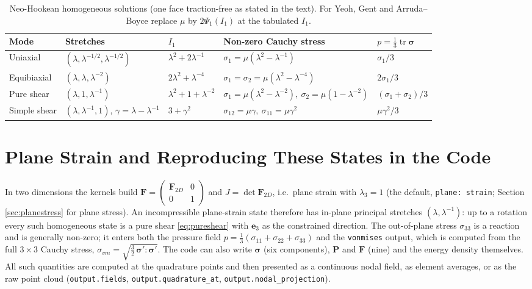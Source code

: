 \documentclass[11pt]{article}
\newcommand{\tr}{\operatorname{tr}}
\newcommand{\be}{\bm{e}}
\newcommand{\bsig}{\bm{\sigma}}
\newcommand{\bP}{\bm{P}}
\newcommand{\bF}{\bm{F}}
\newcommand{\Ione}{I_1}
\newcommand{\Pone}{\Psi_{1}}
\newcommand{\code}[1]{{\frenchspacing\texttt{#1}}}
\begin{document}
\begin{table}[htbp]
\centering
\small
\renewcommand{\arraystretch}{1.5}
\begin{tabular}{@{}l l l l l@{}}
\toprule
Mode & Stretches & $\Ione$ & Non-zero Cauchy stress & $p = \tfrac13\tr\bsig$ \\
\midrule
Uniaxial & $(\lambda, \lambda^{-1/2}, \lambda^{-1/2})$ & $\lambda^2 + 2\lambda^{-1}$ &
  $\sigma_1 = \mu(\lambda^2 - \lambda^{-1})$ & $\sigma_1/3$ \\
Equibiaxial & $(\lambda, \lambda, \lambda^{-2})$ & $2\lambda^2 + \lambda^{-4}$ &
  $\sigma_1 = \sigma_2 = \mu(\lambda^2 - \lambda^{-4})$ & $2\sigma_1/3$ \\
Pure shear & $(\lambda, 1, \lambda^{-1})$ & $\lambda^2 + 1 + \lambda^{-2}$ &
  $\sigma_1 = \mu(\lambda^2 - \lambda^{-2}),\ \sigma_2 = \mu(1 - \lambda^{-2})$ & $(\sigma_1 + \sigma_2)/3$ \\
Simple shear & $(\lambda, \lambda^{-1}, 1)$, $\gamma = \lambda - \lambda^{-1}$ & $3 + \gamma^2$ &
  $\sigma_{12} = \mu\gamma,\ \sigma_{11} = \mu\gamma^2$ & $\mu\gamma^2/3$ \\
\bottomrule
\end{tabular}
\caption{Neo-Hookean homogeneous solutions (one face traction-free as
stated in the text).  For Yeoh, Gent and Arruda--Boyce replace $\mu$ by
$2\Pone(\Ione)$ at the tabulated $\Ione$.}
\label{tab:nh}
\end{table}

\section{Plane Strain and Reproducing These States in the Code}

In two dimensions the kernels build $\bF = \begin{pmatrix}\bF_{2D} & 0\\ 0 & 1\end{pmatrix}$
and $J = \det\bF_{2D}$, i.e.\ plane strain with $\lambda_3 = 1$ (the default,
\code{plane: strain}; Section \ref{sec:planestress} for plane stress).  An
incompressible plane-strain state therefore has in-plane principal
stretches $(\lambda, \lambda^{-1})$: up to a rotation every such
homogeneous state is a pure shear \eqref{eq:pureshear} with $\be_3$ as the
constrained direction.  The out-of-plane stress $\sigma_{33}$ is a reaction
and is generally non-zero; it enters both the pressure field
$p = \tfrac13(\sigma_{11} + \sigma_{22} + \sigma_{33})$ and the
\code{vonmises} output, which is computed from the full $3\times3$ Cauchy
stress, $\sigma_{vm} = \sqrt{\tfrac32\,\bsig':\bsig'}$.  The code can also
write $\bsig$ (six components), $\bP$ and $\bF$ (nine) and the energy
density themselves.  All such quantities are computed at the quadrature
points and then presented as a continuous nodal field, as element averages,
or as the raw point cloud (\code{output.fields}, \code{output.quadrature\_at},
\code{output.nodal\_projection}).
\end{document}
